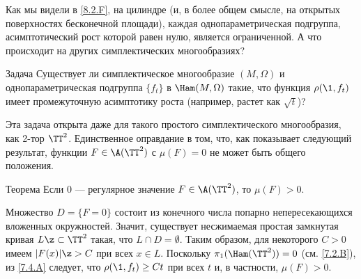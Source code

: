 Как мы видели в \ref{8.2.F}, на цилиндре (и, в более общем смысле, на
открытых поверхностях бесконечной площади), каждая однопараметрическая
подгруппа, асимптотический рост которой равен нулю, является
ограниченной. 
А что происходит на других симплектических многообразиях?

\begin{thm}{Задача}\label{8.4.A}
Существует ли симплектическое многообразие $(M, \Omega)$ и
однопараметрическая подгруппа $\{f_t\}$ в $\Ham (M, \Omega)$ такие,
что функция $\rho (\1, f_t)$ имеет промежуточную асимптотику роста
(например, растет как $\sqrt{t}$)? 
\end{thm}

Эта задача открыта даже для такого простого симплектического
многообразия, как 2-тор $\TT^2$. 
Единственное оправдание в том, что, как показывает следующий
результат, функции $F \in \A (\TT^2)$ с $\mu (F) = 0$ не может быть
общего положения. 

\begin{thm}{Теорема}\label{8.4.B}
Если 0 --- регулярное значение $F \in \A (\TT^2)$, то $\mu (F)> 0$.
\end{thm}

Множество $D = \{F = 0\}$ состоит из конечного числа попарно
непересекающихся вложенных окружностей. 
Значит, существует несжимаемая простая замкнутая кривая $L \z\subset
\TT^2$ такая, что $L\cap D = \emptyset$. 
Таким образом, для некоторого $C> 0$ имеем $| F (x) | \z> C$ при всех $x \in L$.
Поскольку $\pi_1 (\Ham (\TT^2)) = 0$ (см. \ref{7.2.B}),  из
\ref{7.4.A} следует, что $\rho (\1, f_t) \ge Ct$ при всех $t$ и, в
частности, $\mu (F)> 0$. 
\qeds
